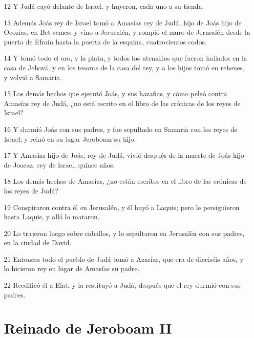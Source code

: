 \par 12 Y Judá cayó delante de Israel, y huyeron, cada uno a su tienda.
\par 13 Además Joás rey de Israel tomó a Amasías rey de Judá, hijo de Joás hijo de Ocozías, en Bet-semes; y vino a Jerusalén, y rompió el muro de Jerusalén desde la puerta de Efraín hasta la puerta de la esquina, cuatrocientos codos.
\par 14 Y tomó todo el oro, y la plata, y todos los utensilios que fueron hallados en la casa de Jehová, y en los tesoros de la casa del rey, y a los hijos tomó en rehenes, y volvió a Samaria.
\par 15 Los demás hechos que ejecutó Joás, y sus hazañas, y cómo peleó contra Amasías rey de Judá, ¿no está escrito en el libro de las crónicas de los reyes de Israel?
\par 16 Y durmió Joás con sus padres, y fue sepultado en Samaria con los reyes de Israel; y reinó en su lugar Jeroboam su hijo.
\par 17 Y Amasías hijo de Joás, rey de Judá, vivió después de la muerte de Joás hijo de Joacaz, rey de Israel, quince años.
\par 18 Los demás hechos de Amasías, ¿no están escritos en el libro de las crónicas de los reyes de Judá?
\par 19 Conspiraron contra él en Jerusalén, y él huyó a Laquis; pero le persiguieron hasta Laquis, y allá lo mataron.
\par 20 Lo trajeron luego sobre caballos, y lo sepultaron en Jerusalén con sus padres, en la ciudad de David.
\par 21 Entonces todo el pueblo de Judá tomó a Azarías, que era de dieciséis años, y lo hicieron rey en lugar de Amasías su padre.
\par 22 Reedificó él a Elat, y la restituyó a Judá, después que el rey durmió con sus padres.

\section*{Reinado de Jeroboam II}

